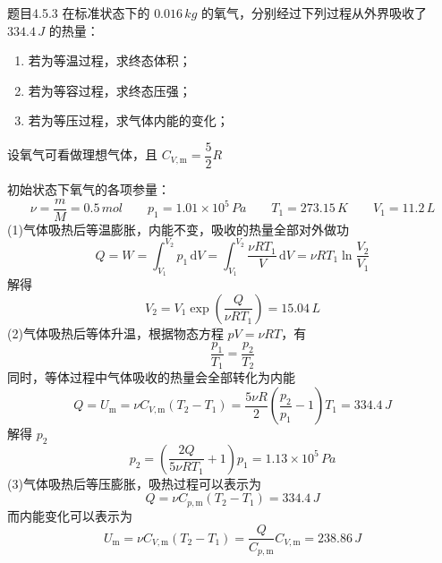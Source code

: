 \begin{question}{题目4.5.3}
    在标准状态下的 $0.016 \,\si{kg}$ 的氧气，分别经过下列过程从外界吸收了 $334.4 \,\si{J}$ 的热量：
    \begin{enumerate}
        \item[(1)] 若为等温过程，求终态体积；
        \item[(2)] 若为等容过程，求终态压强；
        \item[(3)] 若为等压过程，求气体内能的变化；
    \end{enumerate}
    设氧气可看做理想气体，且 $C_{V, \mathrm{m}} = \dfrac{5}{2}R$
\end{question}
\begin{solution}
    初始状态下氧气的各项参量：
    $$
        \nu = \frac{m}{M} = 0.5 \,\si{mol}
        \quad \quad
        p_1 = 1.01 \times 10^5 \,\si{Pa}
        \quad \quad
        T_1 = 273.15 \,\si{K}
        \quad \quad
        V_1 = 11.2 \,\si{L}
    $$
    (1)气体吸热后等温膨胀，内能不变，吸收的热量全部对外做功
    $$
        Q = W  = \int_{V_1}^{V_2} p_1 \,\mathrm{d}V
        = \int_{V_1}^{V_2} \frac{\nu RT_1}{V} \,\mathrm{d}V
        = \nu RT_1 \ln\frac{V_2}{V_1}
    $$
    解得
    $$
        V_2 = V_1 \exp \left(\frac{Q}{\nu RT_1}\right) = 15.04 \,\si{L}
    $$
    (2)气体吸热后等体升温，根据物态方程 $pV = \nu RT$，有
    $$
        \frac{p_1}{T_1} = \frac{p_2}{T_2}
    $$
    同时，等体过程中气体吸收的热量会全部转化为内能
    $$
        Q = U_\mathrm{m} = \nu C_{V,\mathrm{m}}(T_2 - T_1)
        = \frac{5\nu R}{2} \left(\frac{p_2}{p_1} - 1\right)T_1
        = 334.4 \,\si{J}
    $$
    解得 $p_2$
    $$
        p_2 = \left(\frac{2Q}{5 \nu RT_1}+1 \right) p_1 = 1.13 \times 10^5 \,\si{Pa}
    $$
    (3)气体吸热后等压膨胀，吸热过程可以表示为
    $$
        Q = \nu C_{p,\mathrm{m}} (T_2 -T_1) = 334.4 \,\si{J}
    $$
    而内能变化可以表示为
    $$
        U_\mathrm{m} = \nu C_{V,\mathrm{m}}(T_2 - T_1)
        = \frac{Q}{C_{p,\mathrm{m}}} C_{V,\mathrm{m}}
        = 238.86 \,\si{J}
    $$
\end{solution}

